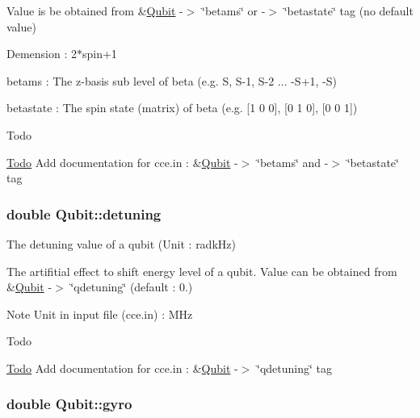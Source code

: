 Value is be obtained from \&\hyperlink{structQubit}{Qubit} -\/$>$ \char`\"{}betams\char`\"{} or -\/$>$ \char`\"{}betastate\char`\"{} tag (no default value)
\begin{DoxyItemize}
\item Demension \-: 2$\ast$spin+1
\item betams \-: The z-\/basis sub level of beta (e.\-g. S, S-\/1, S-\/2 ... -\/\-S+1, -\/\-S)
\item betastate \-: The spin state (matrix) of beta (e.\-g. \mbox{[}1 0 0\mbox{]}, \mbox{[}0 1 0\mbox{]}, \mbox{[}0 0 1\mbox{]}) \begin{DoxyRefDesc}{Todo}
\item[\hyperlink{todo__todo000022}{Todo}]Add documentation for cce.\-in \-: \&\hyperlink{structQubit}{Qubit} -\/$>$ \char`\"{}betams\char`\"{} and -\/$>$ \char`\"{}betastate\char`\"{} tag \end{DoxyRefDesc}

\end{DoxyItemize}\hypertarget{structQubit_a6e0e926587994ef24d67431d0dbef9e7}{
\subsubsection[{detuning}]{\setlength{\rightskip}{0pt plus 5cm}double Qubit\-::detuning}}\label{structQubit_a6e0e926587994ef24d67431d0dbef9e7}


The detuning value of a qubit (Unit \-: radk\-Hz) 

The artifitial effect to shift energy level of a qubit. Value can be obtained from \&\hyperlink{structQubit}{Qubit} -\/$>$ \char`\"{}qdetuning\char`\"{} (default \-: 0.) \begin{DoxyNote}{Note}
Unit in input file (cce.\-in) \-: M\-Hz 
\end{DoxyNote}
\begin{DoxyRefDesc}{Todo}
\item[\hyperlink{todo__todo000019}{Todo}]Add documentation for cce.\-in \-: \&\hyperlink{structQubit}{Qubit} -\/$>$ \char`\"{}qdetuning\char`\"{} tag \end{DoxyRefDesc}
\hypertarget{structQubit_a668a62d3ddf72e6b9acbc6338c97090f}{
\subsubsection[{gyro}]{\setlength{\rightskip}{0pt plus 5cm}double Qubit\-::gyro}}\label{structQubit_a668a62d3ddf72e6b9acbc6338c97090f}


